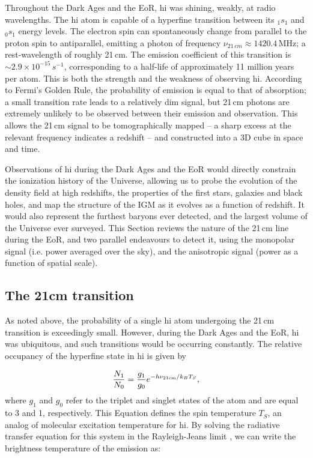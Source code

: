 Throughout the Dark Ages and the EoR, {\sc hi} was shining, weakly, at radio wavelengths. The {\sc hi} atom is capable of a hyperfine transition between its ${}_{1}s_{1}$ and ${}_{0}s_{1}$ energy levels. The electron spin can spontaneously change from parallel to the proton spin to antiparallel, emitting a photon of frequency $\nu_{21\,cm}\approx1420.4$\,MHz; a rest-wavelength of roughly 21\,cm. The emission coefficient of this transition is $\sim 2.9\times10^{-15}\,s^{-1}$, corresponding to a half-life of approximately 11 million years per atom. This is both the strength and the weakness of observing {\sc hi}. According to Fermi's Golden Rule, the probability of emission is equal to that of absorption; a small transition rate leads to a relatively dim signal, but 21\,cm photons are extremely unlikely to be observed between their emission and observation. This allows the 21\,cm signal to be tomographically mapped -- a sharp excess at the relevant frequency indicates a redshift -- and constructed into a 3D cube in space and time.

Observations of {\sc hi} during the Dark Ages and the EoR would directly constrain the ionization history of the Universe, allowing us to probe the evolution of the density field at high redshifts, the properties of the first stars, galaxies and black holes, and map the structure of the IGM as it evolves as a function of redshift. It would also represent the furthest baryons ever detected, and the largest volume of the Universe ever surveyed. This Section reviews the nature of the 21\,cm line during the EoR, and two parallel endeavours to detect it, using the monopolar signal (i.e. power averaged over the sky), and the anisotropic signal (power as a function of spatial scale).

\subsection{The 21cm transition}

As noted above, the probability of a single {\sc hi} atom undergoing the 21\,cm transition is exceedingly small. However, during the Dark Ages and the EoR, {\sc hi} was ubiquitous, and such transitions would be occurring constantly.
The relative occupancy of the hyperfine state in {\sc hi} is given by

\begin{equation}
\frac{N_1}{N_0} = \frac{g_1}{g_0} e^{-h\nu_{\rm 21cm}/k_B T_S},
\end{equation}
where $g_1$ and $g_0$ refer to the triplet and singlet states of the atom and are equal to 3 and 1, respectively. This Equation defines the spin temperature $T_S$, an analog of molecular excitation temperature for {\sc hi}. By solving the radiative transfer equation for this system in the Rayleigh-Jeans limit \citep[e.g.][]{MooreThesis}, we can write the brightness temperature of the emission as:

